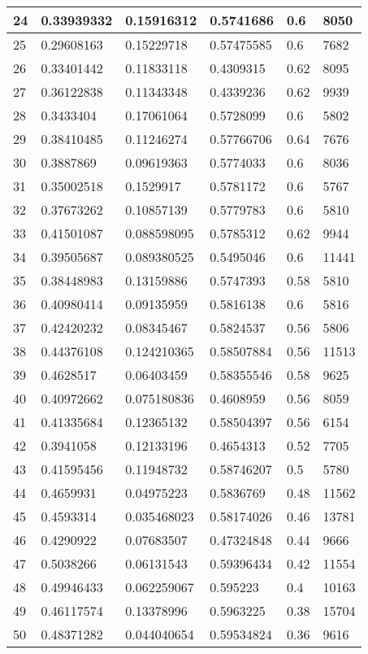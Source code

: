 \begin{longtable}{|l|l|l|l|l|l|}
24 & 0.33939332 & 0.15916312 & 0.5741686 & 0.6 & 8050 \\ \hline 
25 & 0.29608163 & 0.15229718 & 0.57475585 & 0.6 & 7682 \\ \hline 
26 & 0.33401442 & 0.11833118 & 0.4309315 & 0.62 & 8095 \\ \hline 
27 & 0.36122838 & 0.11343348 & 0.4339236 & 0.62 & 9939 \\ \hline 
28 & 0.3433404 & 0.17061064 & 0.5728099 & 0.6 & 5802 \\ \hline 
29 & 0.38410485 & 0.11246274 & 0.57766706 & 0.64 & 7676 \\ \hline 
30 & 0.3887869 & 0.09619363 & 0.5774033 & 0.6 & 8036 \\ \hline 
31 & 0.35002518 & 0.1529917 & 0.5781172 & 0.6 & 5767 \\ \hline 
32 & 0.37673262 & 0.10857139 & 0.5779783 & 0.6 & 5810 \\ \hline 
33 & 0.41501087 & 0.088598095 & 0.5785312 & 0.62 & 9944 \\ \hline 
34 & 0.39505687 & 0.089380525 & 0.5495046 & 0.6 & 11441 \\ \hline 
35 & 0.38448983 & 0.13159886 & 0.5747393 & 0.58 & 5810 \\ \hline 
36 & 0.40980414 & 0.09135959 & 0.5816138 & 0.6 & 5816 \\ \hline 
37 & 0.42420232 & 0.08345467 & 0.5824537 & 0.56 & 5806 \\ \hline 
38 & 0.44376108 & 0.124210365 & 0.58507884 & 0.56 & 11513 \\ \hline 
39 & 0.4628517 & 0.06403459 & 0.58355546 & 0.58 & 9625 \\ \hline 
40 & 0.40972662 & 0.075180836 & 0.4608959 & 0.56 & 8059 \\ \hline 
41 & 0.41335684 & 0.12365132 & 0.58504397 & 0.56 & 6154 \\ \hline 
42 & 0.3941058 & 0.12133196 & 0.4654313 & 0.52 & 7705 \\ \hline 
43 & 0.41595456 & 0.11948732 & 0.58746207 & 0.5 & 5780 \\ \hline 
44 & 0.4659931 & 0.04975223 & 0.5836769 & 0.48 & 11562 \\ \hline 
45 & 0.4593314 & 0.035468023 & 0.58174026 & 0.46 & 13781 \\ \hline 
46 & 0.4290922 & 0.07683507 & 0.47324848 & 0.44 & 9666 \\ \hline 
47 & 0.5038266 & 0.06131543 & 0.59396434 & 0.42 & 11554 \\ \hline 
48 & 0.49946433 & 0.062259067 & 0.595223 & 0.4 & 10163 \\ \hline 
49 & 0.46117574 & 0.13378996 & 0.5963225 & 0.38 & 15704 \\ \hline 
50 & 0.48371282 & 0.044040654 & 0.59534824 & 0.36 & 9616 \\ \hline 
\end{longtable}